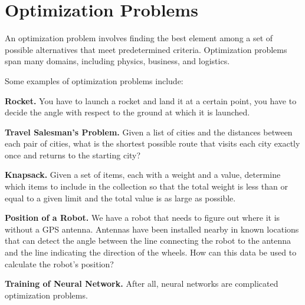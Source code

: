 \chapter{Optimization Problems}
\label{sec:op}

An optimization problem involves finding the best element among a set of possible alternatives that meet predetermined criteria.
Optimization problems span many domains, including physics, business, and logistics.

Some examples of optimization problems include:

\textbf{Rocket.} You have to launch a rocket and land it at a certain point, you have to decide the angle with respect to the ground at which it is launched.


\textbf{Travel Salesman's Problem.} Given a list of cities and the distances between each pair of cities, what is the shortest possible route that visits each city exactly once and returns to the starting city?


\textbf{Knapsack.} Given a set of items, each with a weight and a value, determine which items to include in the collection so that the total weight is less than or equal to a given limit and the total value is as large as possible.

\textbf{Position of a Robot.} We have a robot that needs to figure out where it is without a GPS antenna. Antennas have been installed nearby in known locations that can detect the angle between the line connecting the robot to the antenna and the line indicating the direction of the wheels. How can this data be used to calculate the robot's position?

\textbf{Training of Neural Network.} After all, neural networks are complicated optimization problems.



